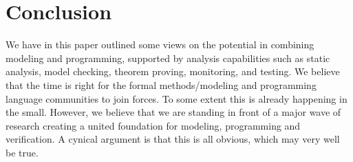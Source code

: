 
\section{Conclusion}

We have in this paper outlined some views on the potential in 
combining modeling and programming, supported by analysis 
capabilities such as static analysis, model checking, theorem 
proving, monitoring, and testing. We believe that the time is right 
for the formal methods/modeling and programming language 
communities to join forces. To some extent this is already 
happening in the small. However, we believe that we are standing in 
front of a major wave of research creating a united foundation for 
modeling, programming and verification. A cynical argument is that 
this is all obvious, which may very well be true. 
